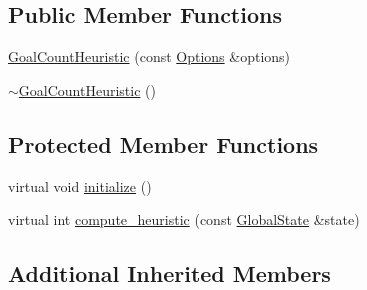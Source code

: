 \subsection*{Public Member Functions}
\begin{DoxyCompactItemize}
\item 
\hyperlink{classGoalCountHeuristic_a790562637bc075454c966327688bb3a3}{Goal\-Count\-Heuristic} (const \hyperlink{classOptions}{Options} \&options)
\item 
\hyperlink{classGoalCountHeuristic_ae90b8ddbeb46d2ee0e796708f02610ec}{$\sim$\-Goal\-Count\-Heuristic} ()
\end{DoxyCompactItemize}
\subsection*{Protected Member Functions}
\begin{DoxyCompactItemize}
\item 
virtual void \hyperlink{classGoalCountHeuristic_acf5e6c906e431756dad659ac1766f182}{initialize} ()
\item 
virtual int \hyperlink{classGoalCountHeuristic_a52d2fbe558008fcaca5819d39806ca31}{compute\-\_\-heuristic} (const \hyperlink{classGlobalState}{Global\-State} \&state)
\end{DoxyCompactItemize}
\subsection*{Additional Inherited Members}


